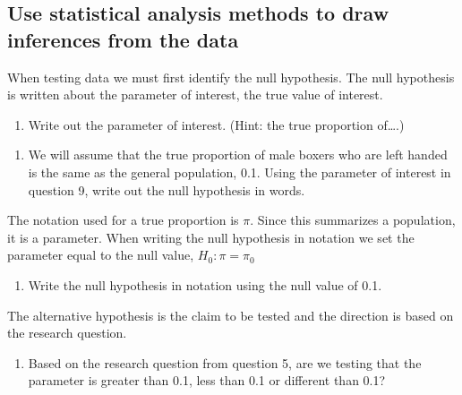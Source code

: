 \documentclass[
]{report}
\providecommand{\tightlist}{%
  \setlength{\itemsep}{0pt}\setlength{\parskip}{0pt}}
\begin{document}
\vspace{0.5in}

\hypertarget{use-statistical-analysis-methods-to-draw-inferences-from-the-data}{%
\subsection{Use statistical analysis methods to draw inferences from the data}\label{use-statistical-analysis-methods-to-draw-inferences-from-the-data}}

When testing data we must first identify the null hypothesis. The null hypothesis is written about the parameter of interest, the true value of interest.

\begin{enumerate}
\def\labelenumi{\arabic{enumi}.}
\setcounter{enumi}{8}
\tightlist
\item
  Write out the parameter of interest. (Hint: the true proportion of\ldots.)
\end{enumerate}

\vspace{1in}

\begin{enumerate}
\def\labelenumi{\arabic{enumi}.}
\setcounter{enumi}{9}
\tightlist
\item
  We will assume that the true proportion of male boxers who are left handed is the same as the general population, 0.1. Using the parameter of interest in question 9, write out the null hypothesis in words.
\end{enumerate}

\vspace{1in}

The notation used for a true proportion is \(\pi\). Since this summarizes a population, it is a parameter. When writing the null hypothesis in notation we set the parameter equal to the null value, \(H_0: \pi = \pi_0\)

\begin{enumerate}
\def\labelenumi{\arabic{enumi}.}
\setcounter{enumi}{10}
\tightlist
\item
  Write the null hypothesis in notation using the null value of 0.1.
\end{enumerate}

\vspace{0.5in}

The alternative hypothesis is the claim to be tested and the direction is based on the research question.

\begin{enumerate}
\def\labelenumi{\arabic{enumi}.}
\setcounter{enumi}{11}
\tightlist
\item
  Based on the research question from question 5, are we testing that the parameter is greater than 0.1, less than 0.1 or different than 0.1?
\end{enumerate}
\end{document}
